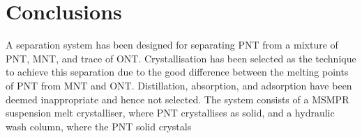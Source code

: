 \section{Conclusions}\label{separation conclusions}

A separation system has been designed for separating PNT from a mixture of PNT, MNT, and trace of ONT. Crystallisation has been selected as the technique to achieve this separation due to the good difference between the melting points of PNT from MNT and ONT. Distillation, absorption, and adsorption have been deemed inappropriate and hence not selected. The system consists of a MSMPR suspension melt crystalliser, where PNT crystallises as solid, and a hydraulic wash column, where the PNT solid crystals